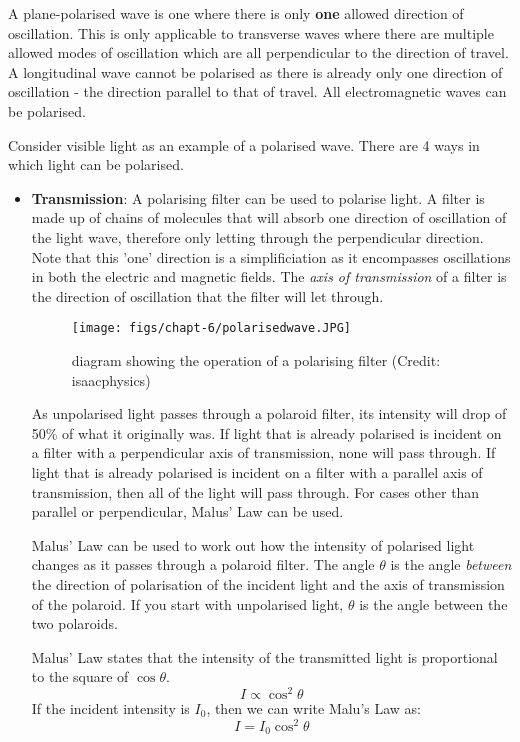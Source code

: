 \documentclass[a4paper,11pt,twoside]{memoir}
\begin{document}
A plane-polarised wave is one where there is only \textbf{one} allowed direction of oscillation. This is only applicable to transverse waves where there are multiple allowed modes of oscillation which are all perpendicular to the direction of travel. A longitudinal wave cannot be polarised as there is already only one direction of oscillation - the direction parallel to that of travel. All electromagnetic waves can be polarised.

Consider visible light as an example of a polarised wave. There are 4 ways in which light can be polarised.

\begin{itemize}
\item\textbf{Transmission}: A polarising filter can be used to polarise light. A filter is made up of chains of molecules that will absorb one direction of oscillation of the light wave, therefore only letting through the perpendicular direction. Note that this 'one' direction is a simplificiation as it encompasses oscillations in both the electric and magnetic fields. The \emph{axis of transmission} of a filter is the direction of oscillation that the filter will let through.

\begin{figure}[h]
\texttt{[image: figs/chapt-6/polarisedwave.JPG]}
\centering
\caption{diagram showing the operation of a polarising filter (Credit: isaacphysics)}
\end{figure}

As unpolarised light passes through a polaroid filter, its intensity will drop of 50\% of what it originally was. If light that is already polarised is incident on a filter with a perpendicular axis of transmission, none will pass through. If light that is already polarised is incident on a filter with a parallel axis of transmission, then all of the light will pass through. For cases other than parallel or perpendicular, Malus' Law can be used.

Malus' Law can be used to work out how the intensity of polarised light changes as it passes through a polaroid filter. The angle $\theta$ is the angle \emph{between} the direction of polarisation of the incident light and the axis of transmission of the polaroid. If you start with unpolarised light, $\theta$ is the angle between the two polaroids.

Malus' Law states that the intensity of the transmitted light is proportional to the square of $\cos\theta$.
$$I \propto \cos^2\theta $$
If the incident intensity is $I_0$, then we can write Malu's Law as:
$$I = I_0\cos^2\theta$$


\end{itemize}
\end{document}

